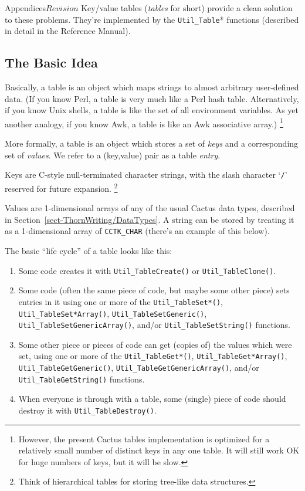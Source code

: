 \begin{cactuspart}{Appendices}{}{$Revision$}
Key/value tables (\textit{tables} for short) provide a clean solution
to these problems.  They're implemented by the \verb|Util_Table|*
functions (described in detail in the Reference Manual).


\subsection{The Basic Idea}

Basically, a table is an object which maps strings to almost arbitrary
user-defined data.  (If you know Perl, a table is very much like a
Perl hash table.  Alternatively, if you know Unix shells, a table is
like the set of all environment variables.  As yet another analogy,
if you know Awk, a table is like an Awk associative array.)%
\footnote{%
	 However, the present Cactus tables implementation
	 is optimized for a relatively small number of
	 distinct keys in any one table.  It will still
	 work OK for huge numbers of keys, but it will be
	 slow.
	 }%

More formally, a table is an object which stores a set of \textit{keys}
and a corresponding set of \textit{values}.  We refer to a (key,value)
pair as a table \textit{entry}.

Keys are C-style null-terminated character strings, with the slash
character `{\tt /}' reserved for future expansion.%
\footnote{%
	 Think of hierarchical tables for storing
	 tree-like data structures.%
	 }%

Values are 1-dimensional arrays of any of the usual Cactus data types,
described in Section~\ref{sect-ThornWriting/DataTypes}.
A string can be stored by treating it as a 1-dimensional array of
\verb|CCTK_CHAR| (there's an example of this below).

The basic ``life cycle'' of a table looks like this:
\begin{enumerate}
\item	Some code creates it with \verb|Util_TableCreate()|
	or \verb|Util_TableClone()|.
\item	Some code (often the same piece of code, but maybe some
	other piece) sets entries in it using one or more of
	the \verb|Util_TableSet*()|, \verb|Util_TableSet*Array()|,
	\verb|Util_TableSetGeneric()|, \verb|Util_TableSetGenericArray()|,
	and/or \verb|Util_TableSetString()| functions.
\item	Some other piece or pieces of code can get (copies of)
	the values which were set, using one or more of the
	\verb|Util_TableGet*()|, \verb|Util_TableGet*Array()|,
	\verb|Util_TableGetGeneric()|, \verb|Util_TableGetGenericArray()|,
	and/or \verb|Util_TableGetString()| functions.
\item	When everyone is through with a table, some (single)
	piece of code should destroy it with \verb|Util_TableDestroy()|.
\end{enumerate}


\end{cactuspart}
